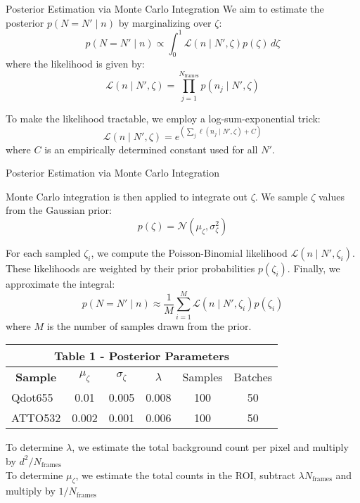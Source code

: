 \documentclass{beamer}					%
\begin{document}
\begin{frame}{Posterior Estimation via Monte Carlo Integration}
We aim to estimate the posterior $p(N = N' \mid n)$ by marginalizing over $\zeta$:
\begin{equation*}
p(N = N' \mid n) \propto \int_{0}^{1} \mathcal{L}(n \mid N', \zeta) p(\zeta) \, d\zeta
\end{equation*}
where the likelihood is given by:
\begin{equation*}
\mathcal{L}(n \mid N', \zeta) = \prod_{j=1}^{N_{\mathrm{frames}}} p(n_j \mid N', \zeta)
\end{equation*}

To make the likelihood tractable, we employ a log-sum-exponential trick:
\begin{equation*}
\mathcal{L}(n \mid N', \zeta) = e^{\left(\sum_j \ell(n_j \mid N', \zeta) + C \right)}
\end{equation*}
where $C$ is an empirically determined constant used for all $N'$.

\end{frame}

\begin{frame}{Posterior Estimation via Monte Carlo Integration}

Monte Carlo integration is then applied to integrate out $\zeta$. We sample $\zeta$ values from the Gaussian prior:
\begin{equation*}
p(\zeta) = \mathcal{N}(\mu_\zeta, \sigma_\zeta^2)
\end{equation*}

For each sampled $\zeta_i$, we compute the Poisson-Binomial likelihood $\mathcal{L}(n \mid N', \zeta_i)$. These likelihoods are weighted by their prior probabilities $p(\zeta_i)$. Finally, we approximate the integral:
\begin{equation*}
p(N = N' \mid n) \approx \frac{1}{M} \sum_{i=1}^{M} \mathcal{L}(n \mid N', \zeta_i) p(\zeta_i)
\end{equation*}
where $M$ is the number of samples drawn from the prior.
\end{frame}

\begin{frame}
\begin{table}[]
\begin{tabular}{lccccc}
\multicolumn{6}{c}{\textbf{Table 1 - Posterior Parameters}} \\ \hline
\multicolumn{1}{c}{\textbf{Sample}}  & $\mu_{\zeta}$ & $\sigma_{\zeta}$ & $\lambda$ & Samples & Batches \\
Qdot655 & 0.01 & 0.005 & 0.008 & 100 & 50 \\
ATTO532 & 0.002 & 0.001 & 0.006 & 100 & 50 \\
\end{tabular}
\end{table}
To determine $\lambda$, we estimate the total background count per pixel and multiply by $d^{2}/N_{\mathrm{frames}}$\\
To determine $\mu_{\zeta}$, we estimate the total counts in the ROI, subtract $\lambda N_{\mathrm{frames}}$ and multiply by $1/N_{\mathrm{frames}}$
\end{frame}
\end{document}
